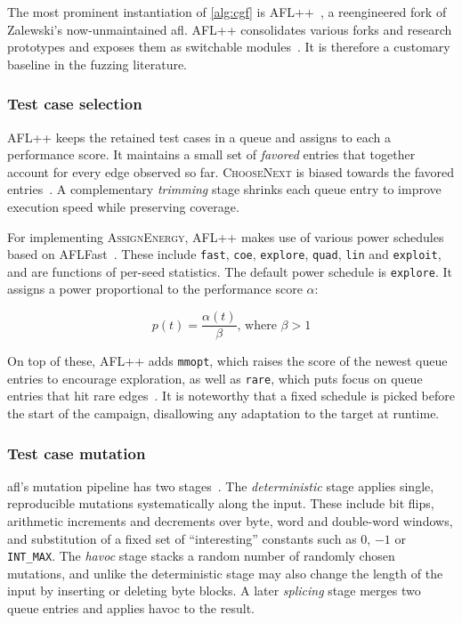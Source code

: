 The most prominent instantiation of \cref{alg:cgf} is
AFL++~\cite{fioraldi_afl_nodate}, a reengineered fork of Zalewski's
now-unmaintained \gls{afl}.
AFL++ consolidates various forks and research prototypes and exposes them as switchable modules~\cite{fioraldi_afl_nodate}.
It is therefore a customary baseline in the fuzzing literature.

\subsubsection{Test case selection}\label{sec:afl-test-case-selection}

AFL++ keeps the retained test cases in a queue and assigns to each a performance score.
It maintains a small set of \emph{favored} entries that together account for every edge observed so far.
\textsc{ChooseNext} is biased towards the favored entries~\cite{fioraldi_afl_nodate}.
A complementary \emph{trimming} stage shrinks each queue entry to improve execution speed while preserving coverage.

For implementing \textsc{AssignEnergy}, AFL++ makes use of various power schedules
based on AFLFast~\cite{bohme_coverage-based_2016}. These include \texttt{fast},
\texttt{coe}, \texttt{explore}, \texttt{quad}, \texttt{lin} and
\texttt{exploit}, and are functions of per-seed statistics.
The default power schedule is \texttt{explore}.
It assigns a power proportional to the performance score $\alpha$:

\[
  p(t)=\frac{\alpha(t)}{\beta}\text{, where }\beta > 1
\]

On top of these, AFL++ adds \texttt{mmopt}, which raises the score of the newest queue
entries to encourage exploration, as well as
\texttt{rare}, which puts focus on queue entries that hit rare edges~\cite{fioraldi_afl_nodate,lemieux_fairfuzz_2018}.
It is noteworthy that a fixed schedule is picked before the start of the campaign, disallowing any adaptation to the target at runtime.

\subsubsection{Test case mutation}

\gls{afl}'s mutation pipeline has two stages~\cite{fioraldi_afl_nodate}.
The \emph{deterministic} stage applies single, reproducible mutations systematically along
the input.
These include bit flips, arithmetic increments and decrements over byte, word and
double-word windows, and substitution of a fixed set of \enquote{interesting} constants
such as $0$, $-1$ or \texttt{INT\_MAX}.
The \emph{havoc} stage stacks a random number of randomly chosen mutations, and unlike the
deterministic stage may also change the length of the input by inserting or deleting
byte blocks.
A later \emph{splicing} stage merges two queue entries and applies havoc to the result.

